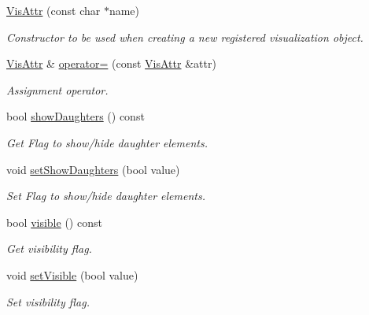 \begin{DoxyCompactItemize}
\hyperlink{class_d_d4hep_1_1_geometry_1_1_vis_attr_aba0f08cd43ea7d03cf730c5549356fa6}{VisAttr} (const char $\ast$name)
\begin{DoxyCompactList}\small\item\em Constructor to be used when creating a new registered visualization object. \item\end{DoxyCompactList}\item 
\hyperlink{class_d_d4hep_1_1_geometry_1_1_vis_attr}{VisAttr} \& \hyperlink{class_d_d4hep_1_1_geometry_1_1_vis_attr_a02a672b6dc4e30bb7208960a7a54f2ac}{operator=} (const \hyperlink{class_d_d4hep_1_1_geometry_1_1_vis_attr}{VisAttr} \&attr)
\begin{DoxyCompactList}\small\item\em Assignment operator. \item\end{DoxyCompactList}\item 
bool \hyperlink{class_d_d4hep_1_1_geometry_1_1_vis_attr_af782d624f358b2a86900ff588841d453}{showDaughters} () const 
\begin{DoxyCompactList}\small\item\em Get Flag to show/hide daughter elements. \item\end{DoxyCompactList}\item 
void \hyperlink{class_d_d4hep_1_1_geometry_1_1_vis_attr_af29f0854b9e6866b31830dd673f92df8}{setShowDaughters} (bool value)
\begin{DoxyCompactList}\small\item\em Set Flag to show/hide daughter elements. \item\end{DoxyCompactList}\item 
bool \hyperlink{class_d_d4hep_1_1_geometry_1_1_vis_attr_a073240f217a17b7f23b30ad036b88f01}{visible} () const 
\begin{DoxyCompactList}\small\item\em Get visibility flag. \item\end{DoxyCompactList}\item 
void \hyperlink{class_d_d4hep_1_1_geometry_1_1_vis_attr_a499e3e8252f4abd62be3a3be521f10b4}{setVisible} (bool value)
\begin{DoxyCompactList}\small\item\em Set visibility flag. \item\end{DoxyCompactList}\item 

\end{DoxyCompactItemize}
